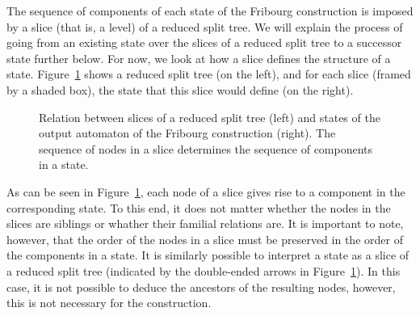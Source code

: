 The sequence of components of each state of the Fribourg construction is imposed by a slice (that is, a level) of a reduced split tree. We will explain the process of going from an existing state over the slices of a reduced split tree to a successor state further below. For now, we look at how a slice defines the structure of a state. Figure~\ref{slices} shows a reduced split tree (on the left), and for each slice (framed by a shaded box), the state that this slice would define (on the right).

\begin{figure}[htb]
\centering
\Slices
\caption{Relation between slices of a reduced split tree (left) and states of the output automaton of the Fribourg construction (right). The sequence of nodes in a slice determines the sequence of components in a state.}
\label{slices}
\end{figure}

As can be seen in Figure~\ref{slices}, each node of a slice gives rise to a component in the corresponding state. To this end, it does not matter whether the nodes in the slices are siblings or whather their familial relations are. It is important to note, however, that the order of the nodes in a slice must be preserved in the order of the components in a state. It is similarly possible to interpret a state as a slice of a reduced split tree (indicated by the double-ended arrows in Figure~\ref{slices}). In this case, it is not possible to deduce the ancestors of the resulting nodes, however, this is not necessary for the construction.

